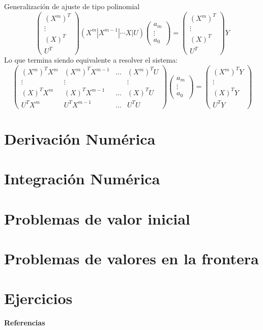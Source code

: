 \documentclass[10pt,legalpaper]{beamer}
\begin{document}
\begin{frame}{Generalización de ajuste  de tipo polinomial}
\begin{displaymath}
\left(
\begin{array}{c}
(X^m)^T\\
\vdots\\
(X)^T\\
U^T
\end{array}
\right)
(X^m|X^{m-1}|\cdots X|U)
\left(
\begin{array}{c}
a_m\\
\vdots\\
a_0
\end{array}
\right)=
\left(
\begin{array}{c}
(X^m)^T\\
\vdots\\
(X)^T\\
U^T
\end{array}
\right)
Y
\end{displaymath}
Lo que termina siendo equivalente a resolver el sistema:
\begin{displaymath}
\left(
\begin{array}{cccc}
(X^m)^TX^m & (X^m)^TX^{m-1} &\hdots & (X^m)^TU\\
\vdots&\vdots &&\vdots\\
(X)^TX^m&(X)^TX^{m-1}&\hdots &(X)^TU\\
U^TX^m&U^TX^{m-1}&\hdots &U^TU
\end{array}
\right)
\left(
\begin{array}{c}
a_m\\
\vdots\\
a_0
\end{array}
\right)=
\left(
\begin{array}{c}
(X^m)^TY\\
\vdots\\
(X)^TY\\
U^TY
\end{array}
\right)
\end{displaymath}
\end{frame}
\section{Derivación Numérica}
\section{Integración Numérica}
\section{Problemas de valor inicial}
\section{Problemas de valores en la frontera}
\section{Ejercicios}

\begin{frame}{\textbf{Referencias}}
\printbibliography
\end{frame}
\end{document}
